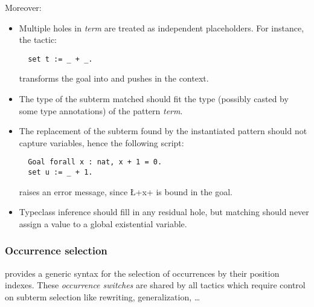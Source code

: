 Moreover:
\begin{itemize}
\item Multiple holes in \textit{term} are treated as independent
  placeholders. For instance, the tactic:
\begin{lstlisting}
  set t := _ + _.
\end{lstlisting}
transforms the goal  into  and pushes
 in the context.
\item The type of the subterm matched should fit the type
  (possibly casted by some type annotations) of the pattern
  \textit{term}.
\item The replacement of the subterm found by the instantiated pattern
  should not capture variables, hence the following script:
\begin{lstlisting}
  Goal forall x : nat, x + 1 = 0.
  set u := _ + 1.
\end{lstlisting}
raises an error message, since \L+x+ is bound in the goal.
\item Typeclass inference should fill in any residual hole, but
matching should never assign a value to a global existential variable.

\end{itemize}


\subsubsection*{Occurrence selection}\label{sssec:occselect}

\ssr{} provides a generic syntax for the selection of occurrences by
their position indexes. These \emph{occurrence switches} are shared by
all
\ssr{} tactics which require control on subterm selection like rewriting,
generalization, \dots

